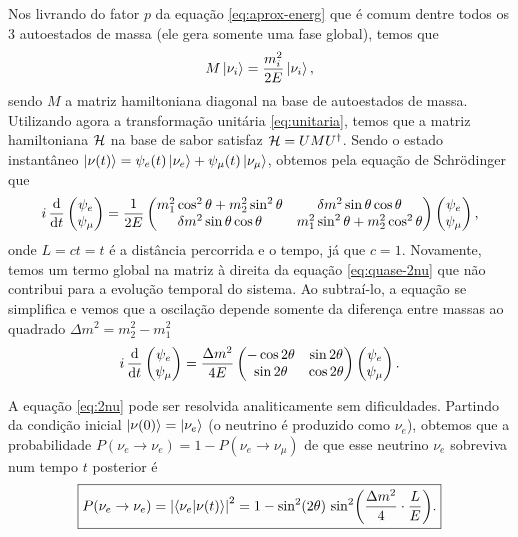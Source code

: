 \documentclass[12pt]{report}
\begin{document}
Nos livrando do fator $p$ da equação \ref{eq:aprox-energ} que é comum dentre todos os 3 autoestados de massa (ele gera somente uma fase global), temos que
\begin{equation} \label{eq:mass-eigen}
M \ket{\nu_i} = \frac{m_i^2}{2E} \ket{\nu_i},
\end{equation}
sendo $M$ a matriz hamiltoniana diagonal na base de autoestados de massa. Utilizando agora a transformação unitária \ref{eq:unitaria}, temos que a matriz hamiltoniana $\mathcal{H}$ na base de sabor satisfaz $\mathcal{H} = U M U^\dagger$. Sendo o estado instantâneo $\ket{\nu(t)} = \psi_e(t) \ket{\nu_e} + \psi_\mu(t) \ket{\nu_\mu}$, obtemos pela equação de Schrödinger que
\begin{equation} \label{eq:quase-2nu}
i \, \dv{t}
\begin{pmatrix}
\psi_e \\ \psi_\mu
\end{pmatrix} = \frac{1}{2E}
\begin{pmatrix}
m_1^2 \cos^2\theta + m_2^2 \sin^2 \theta & \delta m^2 \sin\theta \cos\theta \\
\delta m^2 \sin\theta \cos\theta & m_1^2 \sin^2\theta + m_2^2 \cos^2\theta
\end{pmatrix}
\begin{pmatrix}
\psi_e \\ \psi_\mu
\end{pmatrix},
\end{equation}
onde $L = ct = t$ é a distância percorrida e o tempo, já que $c = 1$. Novamente, temos um termo global na matriz à direita da equação \ref{eq:quase-2nu} que não contribui para a evolução temporal do sistema. Ao subtraí-lo, a equação se simplifica e vemos que a oscilação depende somente da diferença entre massas ao quadrado $\Delta m^2 = m_2^2 - m_1^2$
\begin{equation} \label{eq:2nu}
i \, \dv{t}
\begin{pmatrix}
\psi_e \\ \psi_\mu
\end{pmatrix} = \frac{\Delta m^2}{4E}
\begin{pmatrix}
-\cos2\theta & \sin2\theta \\
\sin2\theta & \cos2\theta
\end{pmatrix}
\begin{pmatrix}
\psi_e \\ \psi_\mu
\end{pmatrix}.
\end{equation}

A equação \ref{eq:2nu} pode ser resolvida analiticamente sem dificuldades. Partindo da condição inicial $\ket{\nu(0)} = \ket{\nu_e}$ (o neutrino é produzido como $\nu_e$), obtemos que a probabilidade $P(\nu_e \to \nu_e) = 1 - P(\nu_e \to \nu_\mu)$ de que esse neutrino $\nu_e$ sobreviva num tempo $t$ posterior é
\begin{equation} \label{eq:sobrev-2nu}
\boxed{
P(\nu_e \to \nu_e) = \abs{\braket{\nu_e}{\nu(t)}}^2 =
1 - \sin[2](2 \theta) \, \sin[2](\frac{\Delta m^2}{4} \cdot \frac{L}{E}). }
\end{equation}
\end{document}
